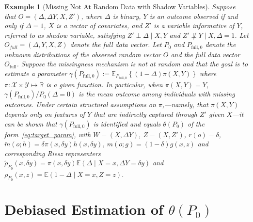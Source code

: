 \documentclass[twoside,11pt]{article}
\newtheorem{example}{Example}
\newcommand{\E}{\mathbb{E}}
\newcommand{\mc}{\mathcal}
\begin{document}
\begin{example}[Missing Not At Random Data with Shadow Variables]\label{example_mnar}
Suppose that $O=(\Delta,\Delta Y,X,Z')$, where $\Delta$ is binary, $Y$ is an outcome observed if and only if $\Delta = 1$, $X$ is a vector of covariates, and $Z'$ is a variable informative of $Y$, referred to as shadow variable, satisfying $Z'\perp \Delta\mid X,Y$ and $Z'\not\perp Y\mid X,\Delta=1$. Let $O_{full}=(\Delta, Y,X,Z)$ denote the full data vector. Let $P_0$ and $P_{\text{full},0}$ denote the unknown distributions of the observed random vector $O$ and the full data vector $O_{\text{full}}$. Suppose the missingness mechanism is not at random and that the goal is to estimate a parameter $\gamma(P_{\text{full},0}) := \mathbb{E}_{P_{\text{full},0}}\left\{ (1-\Delta)\pi(X, Y) \right\}$ where $\pi:\mc{X}\times\mc{Y}\mapsto\mathbb{R}$ is a given function. In particular, when $\pi(X, Y) = Y$, $\gamma(P_{\text{full},0})/P_0(\Delta=0)$ is the mean outcome among individuals with missing outcomes. Under certain structural assumptions on $\pi$,---namely, that $\pi(X,Y)$ depends only on features of $Y$ that are indirectly captured through $Z'$ given $X$---it can be shown \citep{miao2016varieties, li2023non,miao2024identification} that $\gamma(P_{\text{full},0})$ is identified and equals $\theta(P_0)$ of the form~\eqref{eq:target_param}, with $W=(X,\Delta Y)$, $Z=(X,Z')$,
$ 
r(o)=\delta$, $ \widetilde{m}(o;h)=\delta\pi(x,\delta y)h(x,\delta y)$, $  m(o;g)=(1-\delta)g(x,z)$ and corresponding Riesz representers $\tilde\rho_{P_0}(x,\delta y)=\pi(x,\delta y)\E(\Delta\mid X=x,\Delta Y=\delta y)$ and $\rho_{P_0}(x,z)=\E(1-\Delta\mid X=x,Z=z)$.
\end{example}


\section{Debiased Estimation of $\theta(P_0)$}\label{sec:estimation}
\end{document}
